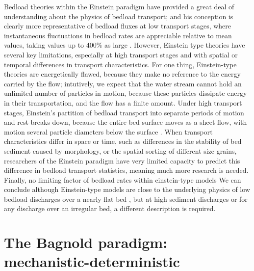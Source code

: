 \documentclass{article}
\begin{document}
Bedload theories within the Einstein paradigm have provided a great deal of understanding about the physics of bedload transport; and his conception is clearly more representative of bedload fluxes at low transport stages, where instantaneous fluctuations in bedload rates are appreciable relative to mean values, taking values up to 400\% as large \citep{Bohm2004, Ancey2008, Singh2009, Heyman2016}. 
However, Einstein type theories have several key limitations, especially at high transport stages and with spatial or temporal differences in transport characteristics.  
For one thing, Einstein-type theories are energetically flawed, because they make no reference to the energy carried by the flow; intutively, we expect that the water stream cannot hold an unlimited number of particles in motion, because these particles dissipate energy in their transportation, and the flow has a finite amount. 
Under high transport stages, Einstein's partition of bedload transport into separate periods of motion and rest breaks down, because the entire bed surface moves as a sheet flow, with motion several particle diameters below the surface \citep{Jenkins1998, Mouilleron2009, Houssais2015}. 
When transport characteristics differ in space or time, such as differences in the stability of bed sediment caused by morphology, or the spatial sorting of different size grains, researchers of the Einstein paradigm have very limited capacity to predict this difference in bedload transport statistics, meaning much more research is needed. 
Finally, no limiting factor of bedload rates within einstein-type models 
We can conclude although Einstein-type models are close to the underlying physics of low bedload discharges over a nearly flat bed \citep{Ancey2008, Heyman2013, Ma2014}, but at high sediment discharges or for any discharge over an irregular bed, a different description is required. 

\section{The Bagnold paradigm: mechanistic-deterministic} 
\end{document}
